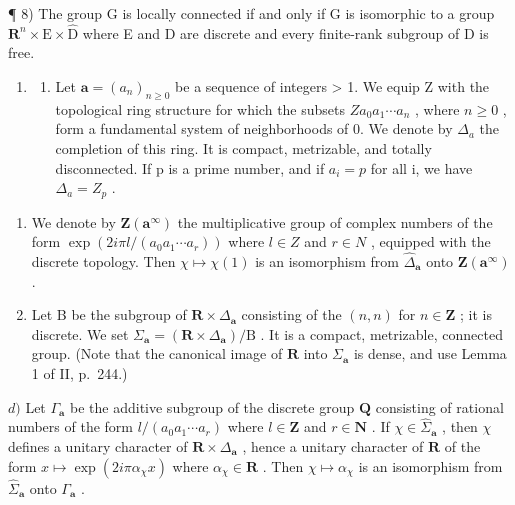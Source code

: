 ¶ 8) The group G is locally connected if and only if G is isomorphic to a group \(\mathbf{R}^{n}\times\mathrm{E}\times\widehat{\mathrm{D}}\) where E and D are discrete and every finite-rank subgroup of D is free.

\begin{enumerate}
\def\labelenumi{\arabic{enumi})}
\setcounter{enumi}{8}
\tightlist
\item
  \begin{enumerate}
  \def\labelenumii{\alph{enumii})}
  \tightlist
  \item
    Let \(\boldsymbol{a}=(a_{n})_{n\geqslant0}\) be a sequence of integers \textgreater{} 1. We equip Z with the topological ring structure for which the subsets \(Za_{0}a_{1}\cdots a_{n}\) , where \(n\geqslant0\) , form a fundamental system of neighborhoods of 0. We denote by \(\Delta_{a}\) the completion of this ring. It is compact, metrizable, and totally disconnected. If p is a prime number, and if \(a_{i}=p\) for all i, we have \(\Delta_{a}=Z_{p}\) .
  \end{enumerate}
\end{enumerate}

\begin{enumerate}
\def\labelenumi{\alph{enumi})}
\setcounter{enumi}{1}
\item
  We denote by \(\mathbf{Z}(\boldsymbol{a}^{\infty})\) the multiplicative group of complex numbers of the form \(\exp(2i\pi l/(a_{0}a_{1}\cdots a_{r}))\) where \(l \in Z\) and \(r \in N\) , equipped with the discrete topology. Then \(\chi \mapsto \chi(1)\) is an isomorphism from \(\widehat{\Delta}_{\boldsymbol{a}}\) onto \(\mathbf{Z}(\boldsymbol{a}^{\infty})\) .
\item
  Let B be the subgroup of \(\mathbf{R} \times \Delta_{\boldsymbol{a}}\) consisting of the \((n, n)\) for \(n \in \mathbf{Z}\) ; it is discrete. We set \(\Sigma_{\boldsymbol{a}} = (\mathbf{R} \times \Delta_{\boldsymbol{a}})/\mathrm{B}\) . It is a compact, metrizable, connected group. (Note that the canonical image of \(\mathbf{R}\) into \(\Sigma_{\boldsymbol{a}}\) is dense, and use Lemma 1 of II, p.~244.)
\end{enumerate}

\(d)\) Let \(\Gamma_{\boldsymbol{a}}\) be the additive subgroup of the discrete group \(\mathbf{Q}\) consisting of rational numbers of the form \(l/(a_{0}a_{1}\cdots a_{r})\) where \(l\in\mathbf{Z}\) and \(r\in\mathbf{N}\) . If \(\chi\in\widehat{\Sigma}_{\boldsymbol{a}}\) , then \(\chi\) defines a unitary character of \(\mathbf{R}\times\Delta_{\boldsymbol{a}}\) , hence a unitary character of \(\mathbf{R}\) of the form \(x\mapsto\exp(2i\pi\alpha_{\chi}x)\) where \(\alpha_{\chi}\in\mathbf{R}\) . Then \(\chi\mapsto\alpha_{\chi}\) is an isomorphism from \(\widehat{\Sigma}_{\boldsymbol{a}}\) onto \(\Gamma_{\boldsymbol{a}}\) .

